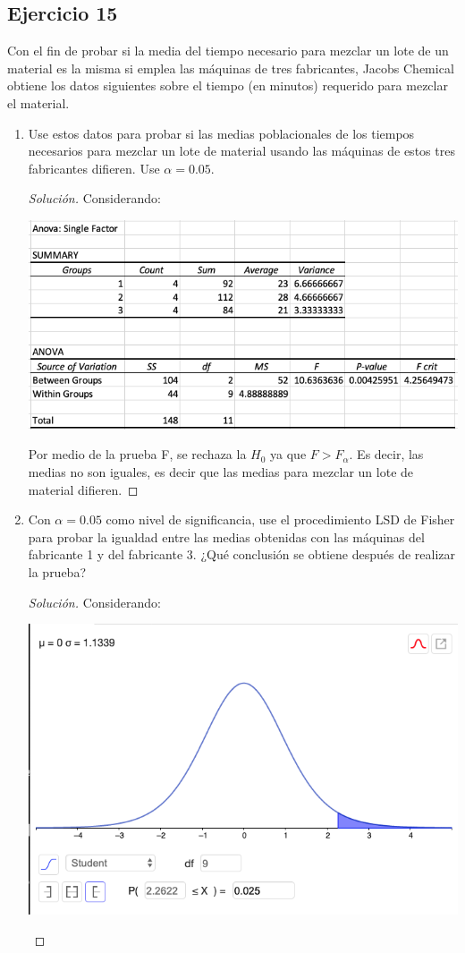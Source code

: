 \documentclass[a4paper,12pt]{article}
\newenvironment{solution}
  {\renewcommand\qedsymbol{$\blacksquare$}\begin{proof}[Solución]}
  {\end{proof}}
\begin{document}
\subsection{Ejercicio 15}
Con el fin de probar si la media del tiempo necesario para mezclar un lote de un material es la misma si emplea las máquinas de tres fabricantes, Jacobs Chemical obtiene los datos siguientes sobre el tiempo (en minutos) requerido para mezclar el material.
\begin{enumerate}
\item Use estos datos para probar si las medias poblacionales de los tiempos necesarios para mezclar un lote de material usando las máquinas de estos tres fabricantes difieren. Use $\alpha= 0.05$.
\begin{solution}
Considerando: 
\begin{center}
    \includegraphics[scale=0.5]{Imagenes/15.png}
\end{center}
Por medio de la prueba F, se rechaza la $H_0$ ya que $F>F_\alpha$. Es decir, las medias no son iguales, es decir que las medias para mezclar un lote de material difieren.
\end{solution}
\item Con $\alpha=0.05$ como nivel de significancia, use el procedimiento LSD de Fisher para probar la igualdad entre las medias obtenidas con las máquinas del fabricante 1 y del fabricante 3. ¿Qué conclusión se obtiene después de realizar la prueba?
\begin{solution}
Considerando: \begin{center}
    \includegraphics[scale=0.5]{Imagenes/15-2.png}

\end{center}
\end{solution}
\end{enumerate}
\end{document}
